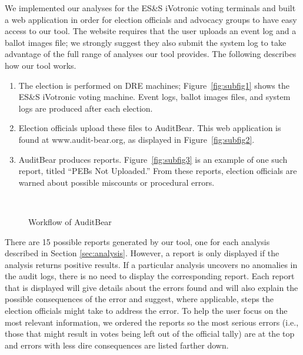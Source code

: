 \smvertspace
We implemented our analyses for the ES\&S iVotronic voting terminals
and built a web application in order for election officials and
advocacy groups to have easy access to our tool. The website requires
that the user uploads an event log and a ballot images file; we strongly
suggest they also submit the system log to take advantage of the
full range of analyses our tool provides.  The following describes how
our tool works.   

\begin{enumerate}
\item
The election is performed on DRE machines; Figure~\ref{fig:subfig1} shows the ES\&S iVotronic voting machine.  Event logs, ballot images files, and system logs are produced after each election.
\item
Election officials upload these files to AuditBear.  This web application is found at www.audit-bear.org, as displayed in Figure~\ref{fig:subfig2}.  
\item
AuditBear produces reports.  Figure~\ref{fig:subfig3} is an example of
one such report, titled ``PEBs Not Uploaded.'' From these reports,
election officials are 
warned about possible miscounts or procedural errors.  
\end{enumerate}

\begin{figure}[h]
\centering
\mbox{
}
\caption{Workflow of AuditBear}
\label{auditBear}
\end{figure}


There are 15 possible reports generated by our tool, one
for each analysis described in Section \ref{sec:analysis}.  However, a report is only
displayed if the analysis returns positive results. If a particular
analysis uncovers no anomalies in the audit logs, there is no need to display the
corresponding report. Each report that is displayed will give details
about the errors found and will
also explain the possible consequences of the error and suggest, where
applicable, steps the election officials might take to address
the error. To help the user focus on the most relevant information, we
ordered the reports so the most serious errors (i.e., those that might
result in votes being left out of the official tally) are at the top
and errors with less dire consequences are listed farther down. 

